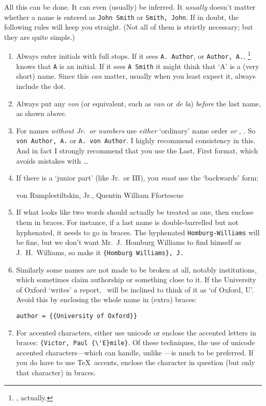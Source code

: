 All this can be done. It can even (usually) be inferred. It
\emph{usually} doesn't matter whether a name is entered as
\verb|John Smith| or \verb|Smith, John|. If in doubt, the following
rules will keep you straight. (Not all of them is strictly necessary;
but they are quite simple.)

\begin{enumerate}
\item Always enter initials with full stops. If it sees
  \verb|A. Author|, or \verb|Author, A.|,
  \biblatex\footnote{, actually.} knows that \verb|A|
  is an initial. If it sees \verb|A Smith| it might think that `A' is
  a (very short) name. Since this \emph{can} matter, usually when you
  least expect it, always include the dot.
\item Always put any \emph{von} (or equivalent, such as \emph{van} or
  \emph{de la}) \emph{before} the last name, as shown above.
\item For names \emph{without Jr.\ or numbers} use \emph{either}
  `ordinary' name order \emph{or} , . So \verb|von Author, A.| or
  \verb|A. von Author|. I highly recommend consistency in this. And in
  fact I strongly recommend that you use the Last, First format, which
  avoids mistakes with \ldots
\item If there is a `junior part' (like Jr.\ or III), you \emph{must}
  use the `backwards' form:\begin{center}von Rumplestiltskin, Jr.,
    Quentin William Ffortescue\end{center}
\item If what looks like two words should actually be treated as one,
  then enclose them in braces. For instance, if a last name is
  double-barrelled but not hyphenated, it needs to go in braces. The
  hyphenated \verb|Homburg-Williams| will be fine, but we don't want
  Mr.~J.\ Homburg Williams to find himself as J.\ H.~Williams, so make
  it \verb|{Homburg Williams}, J.|
\item Similarly some names are not made to be broken at all, notably
  institutions, which sometimes claim authorship or something close to
  it. If the University of Oxford `writes' a report, \biblatex\ will
  be inclined to think of it as `of Oxford, U'. Avoid this by
  enclosing the whole name in (extra) braces:
\begin{center}
\verb|author = {{University of Oxford}}|
\end{center}
\item For accented characters, either use unicode or enclose the
  accented letters in braces: \verb|{Victor, Paul {\'E}mile}|. Of
  these techniques, the use of unicode accented characters---which
   can handle, unlike \bibtex---is much to be
  preferred. If you do have to use \TeX\ accents, enclose the
  character in question (but only that character) in braces.
\end{enumerate} 

